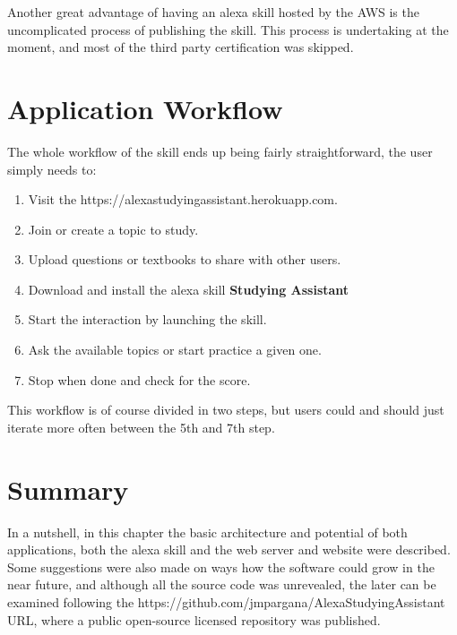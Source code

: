 Another great advantage of having an alexa skill hosted by the AWS is the 
uncomplicated process of publishing the skill. This process is undertaking at the 
moment, and most of the third party certification was skipped.



\section{Application Workflow}

The whole workflow of the skill ends up being fairly straightforward, the user 
simply needs to:

\begin{enumerate}
        \item Visit the https://alexastudyingassistant.herokuapp.com.
        \item Join or create a topic to study.
        \item Upload questions or textbooks to share with other users.
        \item Download and install the alexa skill \textbf{Studying Assistant}
        \item Start the interaction by launching the skill.
        \item Ask the available topics or start practice a given one.
        \item Stop when done and check for the score.
\end{enumerate}

This workflow is of course divided in two steps, but users could and should 
just iterate more often between the 5th and 7th step.


\section{Summary}

In a nutshell, in this chapter the basic architecture and potential of both
applications, both the alexa skill and the web server and website were described.
Some suggestions were also made on ways how the software could grow in the near 
future, and although all the source code was unrevealed, the later can be examined
following the https://github.com/jmpargana/AlexaStudyingAssistant URL, where a
public open-source licensed repository was published.

